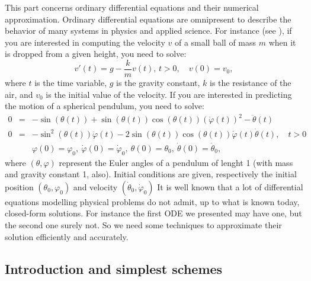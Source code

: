 \documentclass{article}
\begin{document}
This part concerns ordinary differential equations and their numerical approximation. Ordinary differential equations are omnipresent to describe the behavior of many systems in physics and applied science. For instance (see \cite{hairer93}), if you are interested in computing the velocity $v$ of a small ball of mass $m$ when it is dropped from a given height, you need to solve:
\[
v'(t) = g -\frac{k}{m} v(t), \, t>0, \quad v(0) = v_0,
\]
where $t$ is the time variable, $g$ is the gravity constant, $k$ is the resistance of the air, and $v_0$ is the initial value of the velocity. If you are interested in predicting the motion of a spherical pendulum, you need to solve:
\begin{eqnarray*}
0 & = & - \sin(\theta(t)) + \sin(\theta(t)) \cos(\theta(t)) (\dot \varphi(t))^2 - \ddot \theta (t) \\
0 & = & - \sin^2(\theta(t)) \ddot \varphi(t) - 2 \sin(\theta(t)) \cos(\theta(t)) \dot \varphi(t) \dot \theta(t), \quad t>0 \\
& & 
\varphi(0) = \varphi_0, \ 
\dot \varphi(0) = \dot \varphi_0, \ 
\theta(0) = \theta_0, \ 
\dot \theta(0) = \dot \theta_0, 
\end{eqnarray*}
where $(\theta,\varphi)$ represent the Euler angles of a pendulum of lenght 1 (with mass and gravity constant 1, also). Initial conditions are given, respectively the initial position $(\theta_0,\varphi_0)$ and velocity $(\dot \theta_0,\dot \varphi_0)$
It is well known that a lot of differential equations modelling physical problems do not admit, up to what is known today, closed-form solutions. 
For instance the first ODE we presented may have one, but the second one surely not.
So we need some techniques to approximate their solution efficiently and accurately.

\subsection{Introduction and simplest schemes}
\label{sub:edo_intro}

\end{document}
